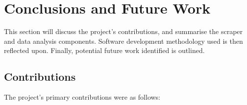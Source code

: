\chapter{Conclusions and Future Work}\label{C:us}

This section will discuss the project's contributions, and summarise the scraper and data analysis components. Software development methodology used is then reflected upon. Finally, potential future work identified is outlined.






\section{Contributions}
The project's primary contributions were as follows:
% 	
% 	
% 	

